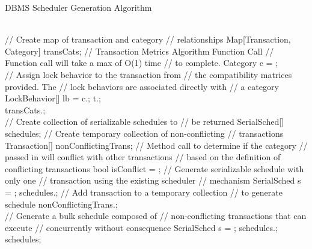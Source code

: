 \documentclass[conference]{IEEEtran}
\begin{document}
\begin{algorithm}
\caption{DBMS Scheduler Generation Algorithm}
\label{alg:generate_sched}
\begin{algorithmic}[1]

   \\
   \State // Create map of transaction and category
   \State // relationships
   \State Map[Transaction, Category] transCats;
      \State // Transaction Metrics Algorithm Function Call
      \State // Function call will take a max of O(1) time
      \State // to complete.
      \State Category c = ; \label{l:getcatfortrans}
      \\
      \State // Assign lock behavior to the transaction from
      \State // the compatibility matrices provided. The 
      \State // lock behaviors are associated directly with
      \State // a category
      \State LockBehavior[] lb = c.; 
      \State t.; \label{l:setlockbehaviors}
      \\
      \State transCats.; \label{l:tcadd}
   \EndFor
   \\
   \State // Create collection of serializable schedules to
   \State // be returned
   \State SerialSched[] schedules;
   \State // Create temporary collection of non-conflicting
   \State // transactions
   \State Transaction[] nonConflictingTrans;
      \State // Method call to determine if the category 
      \State // passed in will conflict with other transactions
      \State // based on the definition of conflicting transactions
      \State bool isConflict = ;
        \State // Generate serializable schedule with only one
        \State // transaction using the existing scheduler 
        \State // mechanism
        \State SerialSched s = ;\label{l:gencsched}
        \State schedules.;
      \Else
        \State // Add transaction to a temporary collection
        \State // to generate schedule
        \State nonConflictingTrans.; \label{l:tempds}
      \EndIf
   \EndFor
   \\
   \State // Generate a bulk schedule composed of 
   \State // non-conflicting transactions that can execute
   \State // concurrently without consequence
   \State SerialSched s = ;\label{l:bulksched}
   \State schedules.;
   \\
   \State \Return schedules; \label{l:rtnsched}
 \EndFunction
 
\end{algorithmic}
\end{algorithm}
\end{document}
